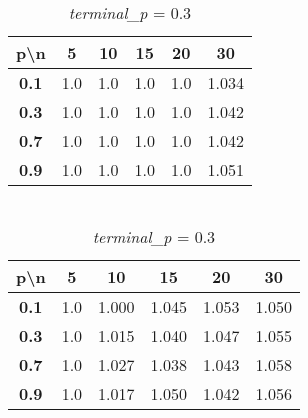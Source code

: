 \documentclass[a4paper,12pt]{article}
\begin{document}
    \begin{table}[h!]
        \begin{minipage}{0.47\textwidth}
            \centering
            \caption*{Average Approximate Coefficient}
            \begin{tabular}{c|ccccc}
                \toprule
                \textbf{p\textbackslash n} & \textbf{5} & \textbf{10} & \textbf{15} & \textbf{20} & \textbf{30} \\
                \midrule
                \textbf{0.1} & 1.0 & 1.0 & 1.0 & 1.0 & 1.034 \\
                \textbf{0.3} & 1.0 & 1.0 & 1.0 & 1.0 & 1.042 \\
                \textbf{0.7} & 1.0 & 1.0 & 1.0 & 1.0 & 1.042 \\
                \textbf{0.9} & 1.0 & 1.0 & 1.0 & 1.0 & 1.051 \\
                \bottomrule
            \end{tabular}
            \caption*{\\\textit{terminal\_p} = $0.1$}
        \end{minipage}
        \hfill
        \begin{minipage}{0.47\textwidth}
            \centering
            \caption*{Average Approximate Coefficient}
            \begin{tabular}{c|ccccc}
                \toprule
                \textbf{p\textbackslash n} & \textbf{5} & \textbf{10} & \textbf{15} & \textbf{20} & \textbf{30} \\
                \midrule
                \textbf{0.1} & 1.0 & 1.000 & 1.045 & 1.053 & 1.050 \\
                \textbf{0.3} & 1.0 & 1.015 & 1.040 & 1.047 & 1.055 \\
                \textbf{0.7} & 1.0 & 1.027 & 1.038 & 1.043 & 1.058 \\
                \textbf{0.9} & 1.0 & 1.017 & 1.050 & 1.042 & 1.056 \\
                \bottomrule
            \end{tabular}
            \caption*{\\\textit{terminal\_p} = $0.3$}
        \end{minipage}
    \end{table}

    \vspace{1em}
\end{document}
